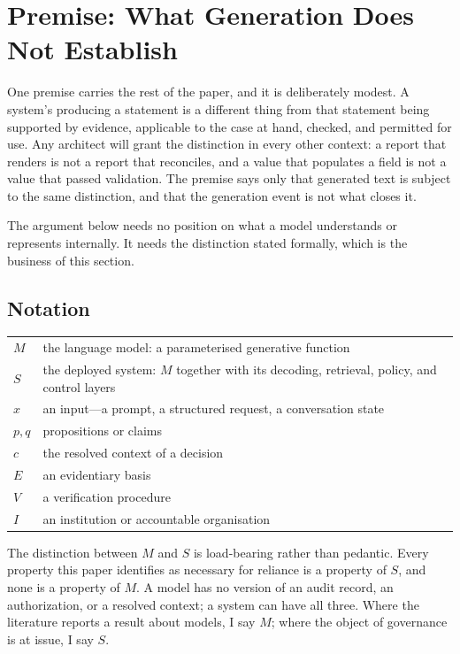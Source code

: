 \section{Premise: What Generation Does Not Establish}
\label{sec:premise}

One premise carries the rest of the paper, and it is deliberately modest. A
system's producing a statement is a different thing from that statement being
supported by evidence, applicable to the case at hand, checked, and permitted for
use. Any architect will grant the distinction in every other context: a report that
renders is not a report that reconciles, and a value that populates a field is not
a value that passed validation. The premise says only that generated text is
subject to the same distinction, and that the generation event is not what closes
it.

The argument below needs no position on what a model understands or represents
internally. It needs the distinction stated formally, which is the business of this
section.

\subsection{Notation}
\label{sec:notation}

\begin{center}
\begin{tabular}{@{}ll@{}}
\toprule
$M$ & the language model: a parameterised generative function \\
$S$ & the deployed system: $M$ together with its decoding, retrieval, policy,
      and control layers \\
$x$ & an input---a prompt, a structured request, a conversation state \\
$p, q$ & propositions or claims \\
$c$ & the resolved context of a decision \\
$E$ & an evidentiary basis \\
$V$ & a verification procedure \\
$I$ & an institution or accountable organisation \\
\bottomrule
\end{tabular}
\end{center}

The distinction between $M$ and $S$ is load-bearing rather than pedantic. Every
property this paper identifies as necessary for reliance is a property of $S$, and
none is a property of $M$. A model has no version of an audit record, an
authorization, or a resolved context; a system can have all three. Where the
literature reports a result about models, I say $M$; where the object of
governance is at issue, I say $S$.

